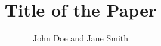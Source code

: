 \documentclass[12pt]{Classes/rebuttal}    %
\title{Title of the Paper}
\author{John Doe and Jane Smith}
\begin{document}
    \label{beginofcontent}
        \maketitle
        
        \newpage
        
        \printbibliography
    \label{endofcontent}
    
    \printStats

    \appenddiffPDF
\end{document}
